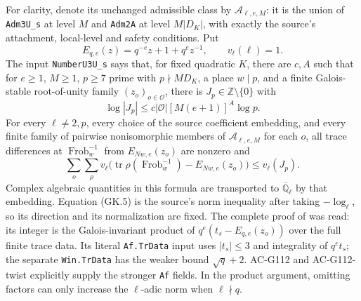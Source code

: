 For clarity, denote its unchanged admissible class by
$\mathcal A_{\ell,e,M}$: it is the union of
\texttt{Adm3U\_s} at level $M$ and \texttt{Adm2A} at level
$M|D_K|$, with exactly the source's attachment, local-level and
safety conditions.  Put
\[
 E_{q,e}(z)=q^{-e}z+1+q^ez^{-1},\qquad v_\ell(\ell)=1.
                                                               \tag{GK.3}
\]
The input \texttt{NumberU3U\_s} says that, for fixed quadratic
$K$, there are $c,A$ such that for $e\ge1$, $M\ge1$,
$p\ge7$ prime with $p\nmid M D_K$, a place $w\mid p$, and
a finite Galois-stable root-of-unity family $(z_o)_{o\in\mathcal O}$,
there is $J_p\in\mathbb Z\setminus\{0\}$ with
\[
 \log|J_p|\le c|\mathcal O|[M(e+1)]^A\log p.                    \tag{GK.4}
\]
For every $\ell\ne2,p$, every choice of the source coefficient
embedding, and every finite family of pairwise nonisomorphic
members of $\mathcal A_{\ell,e,M}$ for each $o$, all trace
differences at $\operatorname{Frob}_w^{-1}$ from
$E_{Nw,e}(z_o)$ are nonzero and
\[
 \sum_o\sum_{\rho}v_\ell
  \bigl(\operatorname{tr}\rho(\operatorname{Frob}_w^{-1})
                       -E_{Nw,e}(z_o)\bigr)\le v_\ell(J_p).
                                                               \tag{GK.5}
\]
Complex algebraic quantities in this formula are transported to
$\overline{\mathbb Q}_\ell$ by that embedding.
Equation (GK.5) is the source's norm inequality after taking
$-\log_\ell$, so its direction and its normalization are fixed.
The complete proof of
was read: its integer is the Galois-invariant product of
$q^e(t_s-E_{q,e}(z_o))$ over the full finite trace data.
Its literal \texttt{Af.TrData} input uses $|t_s|\le3$ and integrality of $q^et_s$; the separate \texttt{Win.TrData} has the weaker bound $\sqrt q+2$. AC-G112 and AC-G112-twist explicitly supply the stronger \texttt{Af} fields. In the product argument,
omitting factors can only increase the $\ell$-adic norm when
$\ell\nmid q$.


